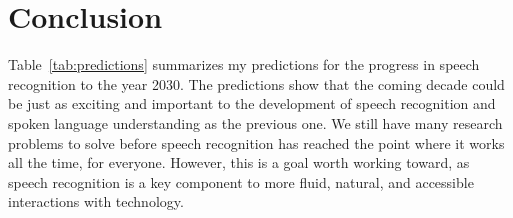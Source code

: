 \section{Conclusion}
\label{sec:conclusion}

Table~\ref{tab:predictions} summarizes my predictions for the progress in
speech recognition to the year 2030. The predictions show that the coming
decade could be just as exciting and important to the development of speech
recognition and spoken language understanding as the previous one. We still
have many research problems to solve before speech recognition has reached the
point where it works all the time, for everyone. However, this is a goal worth
working toward, as speech recognition is a key component to more fluid,
natural, and accessible interactions with technology.
